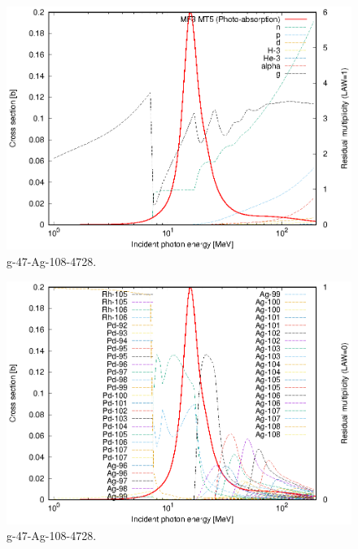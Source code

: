 \begin{figure}
 \includegraphics[width=\linewidth]{eps/g_47-Ag-108_4728.eps}
  \caption{g-47-Ag-108-4728.}
\end{figure}
\begin{figure}
 \includegraphics[width=\linewidth]{eps-law0/g_47-Ag-108_4728.eps}
 \caption{g-47-Ag-108-4728.}
\end{figure}
\newpage \clearpage


